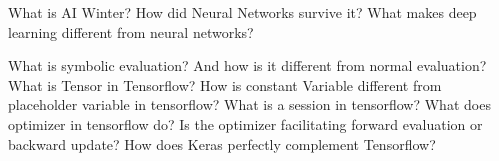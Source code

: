 \documentclass{exam}
\begin{document}
\begin{questions}
\question What is AI Winter? How did Neural Networks survive it? What makes deep learning different from neural networks?


\clearpage


\question What is symbolic evaluation? And how is it different from normal evaluation?
\question What is Tensor in Tensorflow? How is constant Variable different from placeholder variable in tensorflow?
\question What is a session in tensorflow? What does optimizer in tensorflow do? Is the optimizer facilitating forward evaluation or backward update?
\question How does Keras perfectly complement Tensorflow?

\clearpage





\end{questions} 
\end{document}
